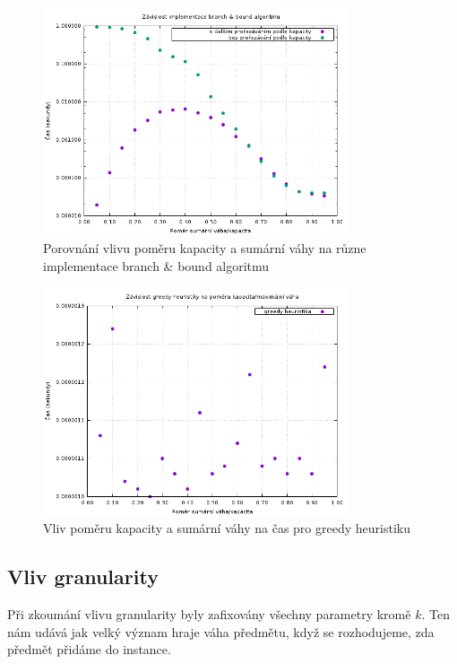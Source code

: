 \documentclass[11pt]{article}
\begin{document}
\begin{figure}[h!]
	\centering
    	\includegraphics[width=0.8\textwidth]{../data/ratiobb.png}
	\caption{Porovnání vlivu poměru kapacity a sumární váhy na různe implementace branch \& bound algoritmu}
	\label{fig:ratiobb}
\end{figure}

\begin{figure}[h!]
	\centering
    	\includegraphics[width=0.8\textwidth]{../data/ratio_greedy.png}
	\caption{Vliv poměru kapacity a sumární váhy na čas pro greedy heuristiku}
	\label{fig:ratio_greedy}
\end{figure}

\subsection{Vliv granularity}

Při zkoumání vlivu granularity byly zafixovány všechny parametry kromě $k$. Ten nám udává jak velký význam hraje váha předmětu, když se rozhodujeme, zda předmět přidáme do instance.
\end{document}
